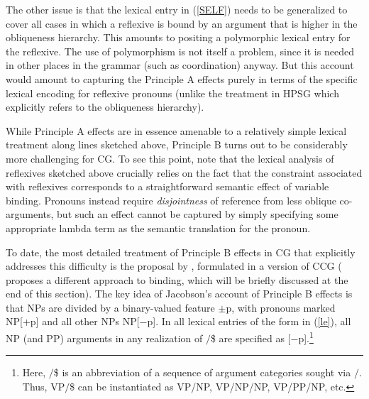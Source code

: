\documentclass[output=paper
                ,modfonts
 	        ,biblatex
                ,babelshorthands
                ,newtxmath
                ,draftmode
                ,colorlinks, citecolor=brown
]{langscibook}
\begin{document}
The other issue is that the lexical entry in (\ref{SELF}) needs to be
generalized to cover all cases in which a reflexive is bound by an
argument that is higher in the obliqueness hierarchy. This amounts to
positing a polymorphic lexical entry for the reflexive. The use of
polymorphism is not itself a problem, since it is needed in other
places in the grammar (such as coordination) anyway. But this account
would amount to capturing the Principle A effects purely in terms of the 
specific lexical encoding for reflexive pronouns (unlike the treatment
in HPSG which explicitly refers to the obliqueness hierarchy).

While Principle A effects are in essence amenable to a 
relatively simple lexical treatment along lines sketched above, Principle B turns out to be
considerably more challenging for CG. To see this point, note that the
lexical analysis of reflexives sketched above crucially relies on the
fact that the constraint associated with reflexives corresponds to a
straightforward semantic effect of variable binding. Pronouns instead
require \emph{disjointness} of reference from less oblique co-arguments, but
such an effect cannot be captured by simply specifying some
appropriate lambda term as the semantic translation for the pronoun.

To date, the most detailed treatment of Principle B effects in CG that
explicitly addresses this difficulty is the proposal by
\citet{Jacobson07}, formulated in a version of CCG
(\citealt{Steedman97a} proposes a different approach to binding,
which will be briefly discussed at the end of this section). The key
idea of Jacobson's account of Principle B effects is that NPs are
divided by a binary-valued feature $\pm$p, with pronouns marked NP[+p]
and all other NPs NP[$-$p]. In all lexical entries of the form in
(\ref{le}), all NP (and PP) arguments in any realization of $/$\$ are
specified as [$-$p].\footnote{Here, $/$\$ is an abbreviation of a
  sequence of argument categories sought via $/$. Thus, VP$/$\$ can be
  instantiated as VP/NP, VP/NP/NP, VP/PP/NP, etc.}
\end{document}
